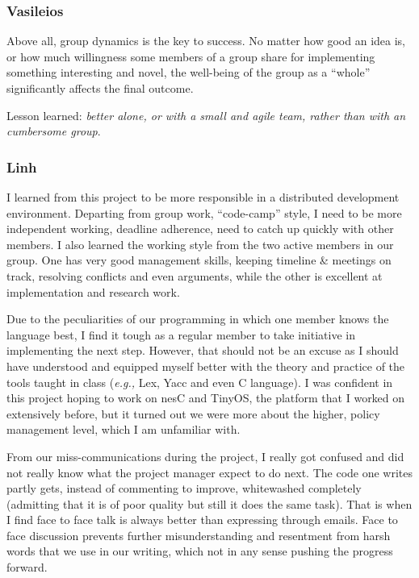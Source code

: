 \subsubsection{Vasileios}

Above all, group dynamics is the key to success. No matter how good an idea
is, or how much willingness some members of a group share for implementing
something interesting and novel, the well-being of the group as a ``whole''
significantly affects the final outcome. 

Lesson learned: \textit{better alone, or with a small and agile team,
rather than with an cumbersome group}.

\subsubsection{Linh}

I learned from this project to be more responsible in a distributed
development environment. Departing from group work, ``code-camp'' style, I 
need to be more independent working, deadline adherence, need to catch up
quickly with other members. I also learned the working style from the two
active members in our group. One has very good management skills, keeping
timeline \& meetings on track, resolving conflicts and even arguments,
while the other is excellent at implementation and research work. 

Due to the peculiarities of our programming in which one member knows the
language best, I find it tough as a regular member to take initiative in
implementing the next step. However, that should not be an excuse as I
should have understood and equipped myself better with the theory and
practice of the tools taught in class (\textit{e.g.,} Lex, Yacc and even C 
language). I was confident in this project hoping to work on nesC and
TinyOS, the platform that I worked on extensively before, but it turned out
we were more about the higher, policy management level, which I am
unfamiliar with.

From our miss-communications during the project, I really got confused and did not really know what the project manager expect to do next. The code
one writes partly gets, instead of commenting to improve, whitewashed
completely (admitting that it is of poor quality but still it does the
same task). That is when I find face to face talk is always better than
expressing through emails. Face to face discussion prevents further
misunderstanding and resentment from harsh words that we use in our
writing, which not in any sense pushing the progress forward.


